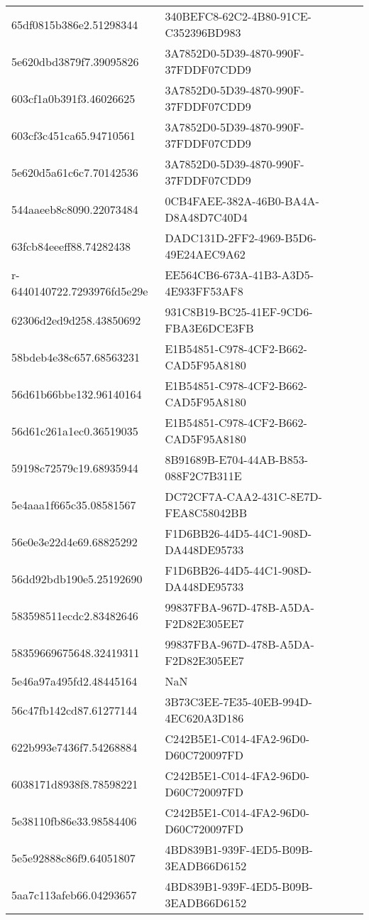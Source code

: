 \begin{tabular}{ll}
65df0815b386e2.51298344 & 340BEFC8-62C2-4B80-91CE-C352396BD983 \\
5e620dbd3879f7.39095826 & 3A7852D0-5D39-4870-990F-37FDDF07CDD9 \\
603cf1a0b391f3.46026625 & 3A7852D0-5D39-4870-990F-37FDDF07CDD9 \\
603cf3c451ca65.94710561 & 3A7852D0-5D39-4870-990F-37FDDF07CDD9 \\
5e620d5a61c6c7.70142536 & 3A7852D0-5D39-4870-990F-37FDDF07CDD9 \\
544aaeeb8c8090.22073484 & 0CB4FAEE-382A-46B0-BA4A-D8A48D7C40D4 \\
63fcb84eeeff88.74282438 & DADC131D-2FF2-4969-B5D6-49E24AEC9A62 \\
r-6440140722.7293976fd5e29e & EE564CB6-673A-41B3-A3D5-4E933FF53AF8 \\
62306d2ed9d258.43850692 & 931C8B19-BC25-41EF-9CD6-FBA3E6DCE3FB \\
58bdeb4e38c657.68563231 & E1B54851-C978-4CF2-B662-CAD5F95A8180 \\
56d61b66bbe132.96140164 & E1B54851-C978-4CF2-B662-CAD5F95A8180 \\
56d61c261a1ec0.36519035 & E1B54851-C978-4CF2-B662-CAD5F95A8180 \\
59198c72579c19.68935944 & 8B91689B-E704-44AB-B853-088F2C7B311E \\
5e4aaa1f665c35.08581567 & DC72CF7A-CAA2-431C-8E7D-FEA8C58042BB \\
56e0e3e22d4e69.68825292 & F1D6BB26-44D5-44C1-908D-DA448DE95733 \\
56dd92bdb190e5.25192690 & F1D6BB26-44D5-44C1-908D-DA448DE95733 \\
583598511ecdc2.83482646 & 99837FBA-967D-478B-A5DA-F2D82E305EE7 \\
58359669675648.32419311 & 99837FBA-967D-478B-A5DA-F2D82E305EE7 \\
5e46a97a495fd2.48445164 & NaN \\
56c47fb142cd87.61277144 & 3B73C3EE-7E35-40EB-994D-4EC620A3D186 \\
622b993e7436f7.54268884 & C242B5E1-C014-4FA2-96D0-D60C720097FD \\
6038171d8938f8.78598221 & C242B5E1-C014-4FA2-96D0-D60C720097FD \\
5e38110fb86e33.98584406 & C242B5E1-C014-4FA2-96D0-D60C720097FD \\
5e5e92888c86f9.64051807 & 4BD839B1-939F-4ED5-B09B-3EADB66D6152 \\
5aa7c113afeb66.04293657 & 4BD839B1-939F-4ED5-B09B-3EADB66D6152 \\

\end{tabular}
